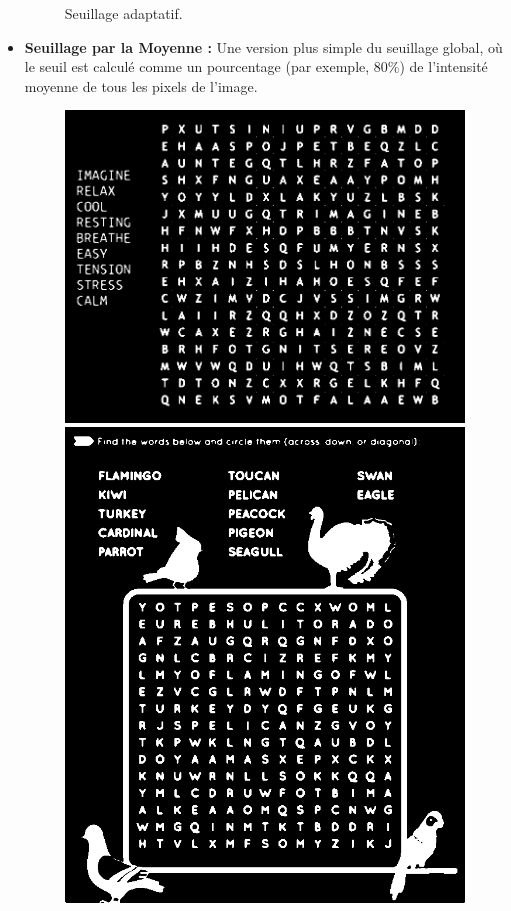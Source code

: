 \documentclass{article}
\begin{document}
\begin{itemize}
\begin{figure}[H]
        \caption{}
      \endminipage
      \caption{Seuillage adaptatif.}
    \end{figure}
    \item \textbf{Seuillage par la Moyenne :} Une version plus simple du seuillage global, où le seuil est calculé comme un pourcentage (par exemple, 80\%) de l'intensité moyenne de tous les pixels de l'image.
    \begin{figure}[H]
      \centering
          \includegraphics[width=\linewidth]{ressources/1level_1_image_1_05_mean_threshold.png}
          \caption{}
        \endminipage\quad\quad\quad\quad
        \includegraphics[width=\linewidth]{ressources/3level_3_image_2_05_mean_threshold.png}

\end{figure}
\end{itemize}
\end{document}
